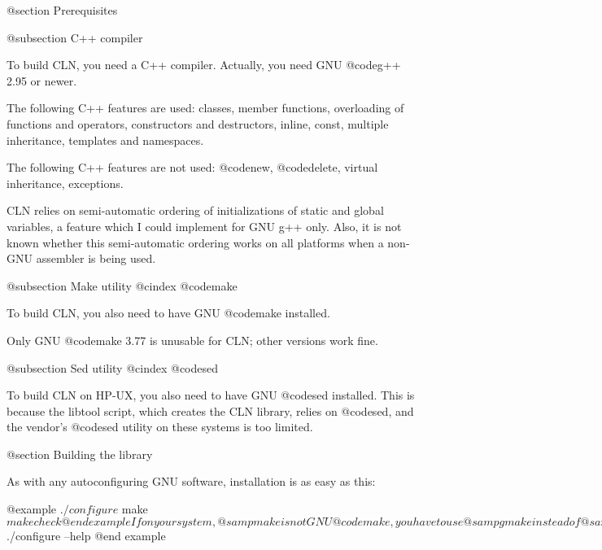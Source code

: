 @section Prerequisites

@subsection C++ compiler

To build CLN, you need a C++ compiler.
Actually, you need GNU @code{g++ 2.95} or newer.

The following C++ features are used:
classes, member functions, overloading of functions and operators,
constructors and destructors, inline, const, multiple inheritance,
templates and namespaces.

The following C++ features are not used:
@code{new}, @code{delete}, virtual inheritance, exceptions.

CLN relies on semi-automatic ordering of initializations of static and
global variables, a feature which I could implement for GNU g++
only. Also, it is not known whether this semi-automatic ordering works
on all platforms when a non-GNU assembler is being used.

@subsection Make utility
@cindex @code{make}

To build CLN, you also need to have GNU @code{make} installed.

Only GNU @code{make} 3.77 is unusable for CLN; other versions work fine.

@subsection Sed utility
@cindex @code{sed}

To build CLN on HP-UX, you also need to have GNU @code{sed} installed.
This is because the libtool script, which creates the CLN library, relies
on @code{sed}, and the vendor's @code{sed} utility on these systems is too
limited.


@section Building the library

As with any autoconfiguring GNU software, installation is as easy as this:

@example
$ ./configure
$ make
$ make check
@end example

If on your system, @samp{make} is not GNU @code{make}, you have to use
@samp{gmake} instead of @samp{make} above.

The @code{configure} command checks out some features of your system and
C++ compiler and builds the @code{Makefile}s. The @code{make} command
builds the library. This step may take about an hour on an average workstation.
The @code{make check} runs some test to check that no important subroutine
has been miscompiled.

The @code{configure} command accepts options. To get a summary of them, try

@example
$ ./configure --help
@end example

